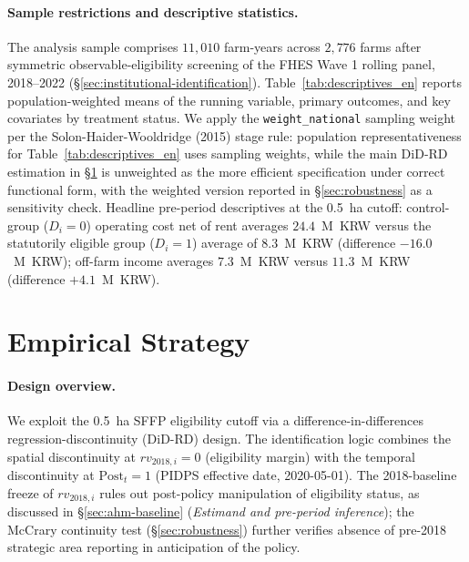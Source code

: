 \documentclass[12pt, a4paper]{article}
\begin{document}
\paragraph{Sample restrictions and descriptive statistics.} The analysis sample comprises $11{,}010$ farm-years across $2{,}776$ farms after symmetric observable-eligibility screening of the FHES Wave 1 rolling panel, 2018--2022 (\S\ref{sec:institutional-identification}). Table~\ref{tab:descriptives_en} reports population-weighted means of the running variable, primary outcomes, and key covariates by treatment status. We apply the \texttt{weight\_national} sampling weight per the Solon-Haider-Wooldridge (2015) stage rule: population representativeness for Table~\ref{tab:descriptives_en} uses sampling weights, while the main DiD-RD estimation in \S\ref{sec:identification} is unweighted as the more efficient specification under correct functional form, with the weighted version reported in \S\ref{sec:robustness} as a sensitivity check. Headline pre-period descriptives at the 0.5~ha cutoff: control-group ($D_i = 0$) operating cost net of rent averages $24.4$~M~KRW versus the statutorily eligible group ($D_i = 1$) average of $8.3$~M~KRW (difference $-16.0$~M~KRW); off-farm income averages $7.3$~M~KRW versus $11.3$~M~KRW (difference $+4.1$~M~KRW).



\section{Empirical Strategy}
\label{sec:identification}

\paragraph{Design overview.} We exploit the 0.5~ha SFFP eligibility cutoff via a difference-in-differences regression-discontinuity (DiD-RD) design. The identification logic combines the spatial discontinuity at $rv_{2018,i} = 0$ (eligibility margin) with the temporal discontinuity at $\text{Post}_t = 1$ (PIDPS effective date, 2020-05-01). The 2018-baseline freeze of $rv_{2018,i}$ rules out post-policy manipulation of eligibility status, as discussed in \S\ref{sec:ahm-baseline} (\textit{Estimand and pre-period inference}); the McCrary continuity test (\S\ref{sec:robustness}) further verifies absence of pre-2018 strategic area reporting in anticipation of the policy.
\end{document}
